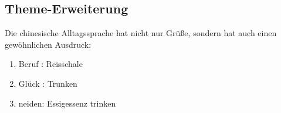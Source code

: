 \subsection{Theme-Erweiterung}
Die chinesische Alltagssprache hat nicht nur Grü\ss e, sondern hat auch einen gew\"ohnlichen Ausdruck:
\begin{enumerate}
	\item Beruf :  Reisschale
	\item Glück : Trunken
	\item neiden:  Essigessenz trinken
\end{enumerate}